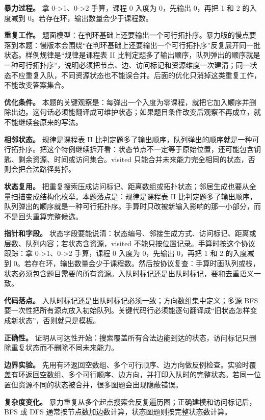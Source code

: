 \textbf{暴力过程。} 拿 0->1、0->2 手算，课程 0 入度为 0，先输出 0，再把 1 和 2 的入度减到 0。若存在环，输出数量会少于课程数。

\textbf{重复工作。} 题面模型：在判环基础上还要输出一个可行拓扑序。暴力版的慢点要落到本题：慢版本会围绕“在判环基础上还要输出一个可行拓扑序”反复展开同一批状态。样例规律是“规律是课程表 II 比判定题多了输出顺序，队列弹出的顺序就是一种可行拓扑序”，说明必须把节点、边、访问标记和资源维度一次建清；同一状态不应重复入队，不同资源状态也不能误合并。后面的优化只消掉这类重复工作，不能改变答案集合。

\textbf{优化条件。} 本题的关键观察是：每弹出一个入度为零课程，就把它加入顺序并删除出边。这句话必须能翻译成可维护状态；如果题目条件改变后观察不再成立，就不能继续套原来的写法。

\textbf{相邻状态。} 规律是课程表 II 比判定题多了输出顺序，队列弹出的顺序就是一种可行拓扑序。把这个特例继续拆开看：状态节点不一定等于原始位置，还可能包含钥匙、剩余资源、时间或访问集合。visited 只能合并未来能力完全相同的状态，否则会把合法路径剪掉。

\textbf{状态复用。} 把重复搜索压成访问标记、距离数组或拓扑状态；邻居生成也要从全量扫描变成结构化枚举。本题落点是：规律是课程表 II 比判定题多了输出顺序，队列弹出的顺序就是一种可行拓扑序。手算时只改被新输入影响的那一小部分，而不是回头重算完整候选。

\textbf{指针和字段。} 状态字段要能说清：状态编号、邻接生成方式、访问标记、距离或层数、队列内容；若状态含资源，visited 不能只按位置记录。手算时按这个协议跟踪：拿 0->1、0->2 手算，课程 0 入度为 0，先输出 0，再把 1 和 2 的入度减到 0。若存在环，输出数量会少于课程数。然后按协议复查：手算时画队列或栈，状态必须包含题目需要的所有资源。入队时标记还是出队时标记，要和去重语义一致。

\textbf{代码落点。} 入队时标记还是出队时标记必须一致；方向数组集中定义；多源 BFS 要一次性把所有源点放入初始队列。关键代码行必须能逐句翻译成“旧状态怎样变成新状态”，否则就只是模板。

\textbf{正确性。} 证明从可达性开始：搜索覆盖所有合法边能到达的状态，访问标记只删除重复状态而不删除不同未来能力。

\textbf{边界实验。} 先用有环返回空数组、多个可行顺序、边方向做反例检查。实验时覆盖有环返回空数组、多个可行顺序、边方向，并打印入队时的完整状态。若同一位置但资源不同的状态被合并，很多图题会出现隐蔽错误。

\textbf{复杂度变化。} 暴力重复从多个起点搜索会反复遍历图；正确建模和访问标记后，BFS 或 DFS 通常按节点数加边数计算，状态图题则按完整状态数计算。

